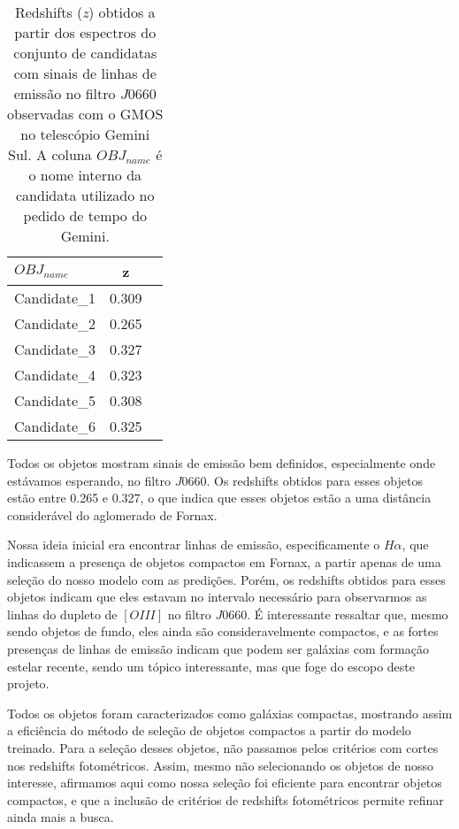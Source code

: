 \begin{table}[!ht]
    \centering
    \caption{Redshifts (\textit{z}) obtidos a partir dos espectros do conjunto de candidatas com sinais de linhas de emissão no filtro $J0660$ observadas com o GMOS no telescópio Gemini Sul. A coluna $OBJ_{name}$ é o nome interno da candidata utilizado no pedido de tempo do Gemini.} 
    \begin{tabular}{lcc}
        \toprule
        $OBJ_{name}$ & z   \\
        \midrule
        Candidate\_1     & 0.309 \\
        Candidate\_2     & 0.265 \\
        Candidate\_3     & 0.327 \\
        Candidate\_4     & 0.323 \\
        Candidate\_5     & 0.308 \\
        Candidate\_6     & 0.325 \\
        \bottomrule
    \end{tabular}
    \label{redshift_candidatas_2}
\end{table}

Todos os objetos mostram sinais de emissão bem definidos, especialmente onde estávamos esperando, no filtro $J0660$. Os redshifts obtidos para esses objetos estão entre 0.265 e 0.327, o que indica que esses objetos estão a uma distância considerável do aglomerado de Fornax.

Nossa ideia inicial era encontrar linhas de emissão, especificamente o $H\alpha$, que indicassem a presença de objetos compactos em Fornax, a partir apenas de uma seleção do nosso modelo com as predições. Porém, os redshifts obtidos para esses objetos indicam que eles estavam no intervalo necessário para observarmos as linhas do dupleto de $[OIII]$ no filtro $J0660$. É interessante ressaltar que, mesmo sendo objetos de fundo, eles ainda são consideravelmente compactos, e as fortes presenças de linhas de emissão indicam que podem ser galáxias com formação estelar recente, sendo um tópico interessante, mas que foge do escopo deste projeto.

Todos os objetos foram caracterizados como galáxias compactas, mostrando assim a eficiência do método de seleção de objetos compactos a partir do modelo treinado. Para a seleção desses objetos, não passamos pelos critérios com cortes nos redshifts fotométricos. Assim, mesmo não selecionando os objetos de nosso interesse, afirmamos aqui como nossa seleção foi eficiente para encontrar objetos compactos, e que a inclusão de critérios de redshifts fotométricos permite refinar ainda mais a busca.

